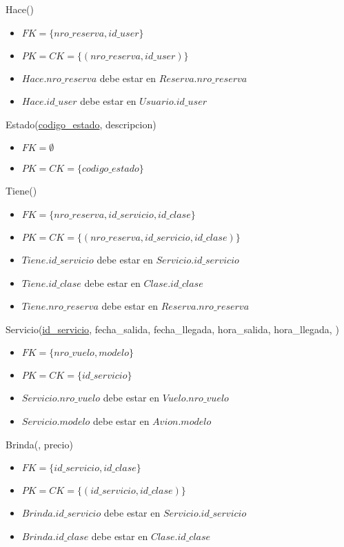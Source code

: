 \vspace*{0.5cm}
\noindent
Hace(\underline{})
\begin{itemize}
	\item $FK = \{nro\_reserva, id\_user\}$
	\item $PK = CK = \{(nro\_reserva, id\_user)\}$
	\item $Hace.nro\_reserva$ debe estar en $Reserva.nro\_reserva$
	\item $Hace.id\_user$ debe estar en $Usuario.id\_user$
\end{itemize}

\vspace*{0.5cm}
\noindent
Estado(\underline{codigo\_estado}, descripcion)
\begin{itemize}
	\item $FK = \emptyset$
	\item $PK = CK = \{codigo\_estado\}$
\end{itemize}

\vspace*{0.5cm}
\noindent
Tiene(\underline{})
\begin{itemize}
	\item $FK = \{nro\_reserva, id\_servicio, id\_clase\}$
	\item $PK = CK = \{(nro\_reserva, id\_servicio, id\_clase)\}$
	\item $Tiene.id\_servicio$ debe estar en $Servicio.id\_servicio$
	\item $Tiene.id\_clase$ debe estar en $Clase.id\_clase$
	\item $Tiene.nro\_reserva$ debe estar en $Reserva.nro\_reserva$
\end{itemize}

\vspace*{0.5cm}
\noindent
Servicio(\underline{id\_servicio}, fecha\_salida, fecha\_llegada,
	hora\_salida, hora\_llegada, )
\begin{itemize}
	\item $FK = \{nro\_vuelo, modelo\}$
	\item $PK = CK = \{id\_servicio\}$
	\item $Servicio.nro\_vuelo$ debe estar en $Vuelo.nro\_vuelo$
	\item $Servicio.modelo$ debe estar en $Avion.modelo$
\end{itemize}

\vspace*{0.5cm}
\noindent
Brinda(\underline{}, precio)
\begin{itemize}
	\item $FK = \{id\_servicio, id\_clase\}$
	\item $PK = CK = \{(id\_servicio, id\_clase)\}$
	\item $Brinda.id\_servicio$ debe estar en $Servicio.id\_servicio$
	\item $Brinda.id\_clase$ debe estar en $Clase.id\_clase$
\end{itemize}

